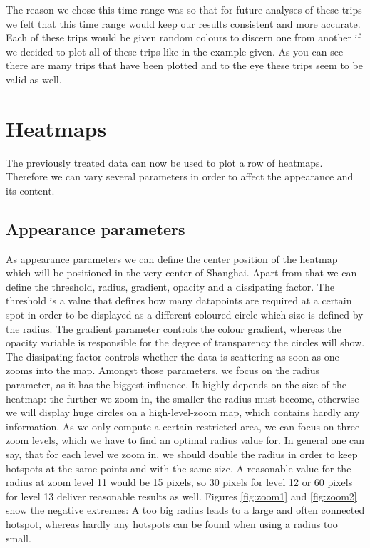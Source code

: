 \documentclass[11pt,conference,a4paper,twocolumns,romanappendices]{IEEEtran}
\begin{document}
The reason we chose this time range was so that for future analyses of these trips we felt that this time range would keep our results consistent and more accurate. Each of these trips would be given random colours to discern one from another if we decided to plot all of these trips like in the example given. As you can see there are many trips that have been plotted and to the eye these trips seem to be valid as well. \\

\section{Heatmaps}
The previously treated data can now be used to plot a row of heatmaps. Therefore we can vary several parameters in order to affect the appearance and its content. \\
\subsection{Appearance parameters}
As appearance parameters we can define the center position of the heatmap which will be positioned in the very center of Shanghai. Apart from that we can define the threshold, radius, gradient, opacity and a dissipating factor. The threshold is a value that defines how many datapoints are required at a certain spot in order to be displayed as a different coloured circle which size is defined by the radius. The gradient parameter controls the colour gradient, whereas the opacity variable is responsible for the degree of transparency the circles will show. The dissipating factor controls whether the data is scattering as soon as one zooms into the map.
Amongst those parameters, we focus on the radius parameter, as it has the biggest influence. It highly depends on the size of the heatmap: the further we zoom in, the smaller the radius must become, otherwise we will display huge circles on a high-level-zoom map, which contains hardly any information. As we only compute a certain restricted area, we can focus on three zoom levels, which we have to find an optimal radius value for. In general one can say, that for each level we zoom in, we should double the radius in order to keep hotspots at the same points and with the same size. A reasonable value for the radius at zoom level 11 would be 15 pixels, so 30 pixels for level 12 or 60 pixels for level 13 deliver reasonable results as well. Figures \ref{fig:zoom1} and \ref{fig:zoom2} show the negative extremes: A too big radius leads to a large and often connected hotspot, whereas hardly any hotspots can be found when using a radius too small.
\end{document}
